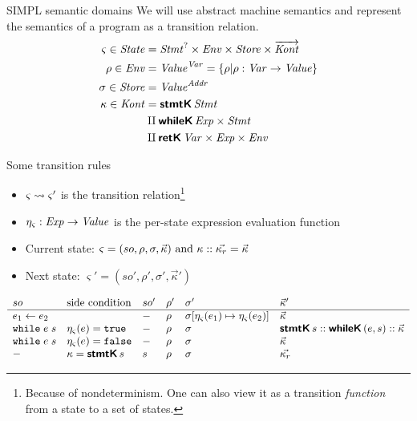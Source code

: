 \documentclass[aspectratio=169]{beamer}
\begin{document}
\begin{frame}{SIMPL semantic domains}
  \begingroup\footnotesize We will use abstract machine semantics and represent the semantics of a program as a transition relation.\endgroup
\begin{align*}
  \varsigma \in \mathit{State} & = \mathit{Stmt}^? \times \mathit{Env} \times \mathit{Store} \times \overrightarrow{\mathit{Kont}} \\
  \rho \in \mathit{Env} & = \mathit{Value}^{\mathit{Var}} = \left\{ \rho \vert \rho : \mathit{Var} \rightarrow \mathit{Value} \right\} \\
  \sigma \in \mathit{Store} & = \mathit{Value}^{\mathit{Addr}} \\
  \kappa \in \mathit{Kont} & = \textsf{\textbf{stmtK}}\,\mathit{Stmt} \\
                       & \amalg \textsf{\textbf{whileK}}\,\mathit{Exp} \times \mathit{Stmt} \\
                       & \amalg \textsf{\textbf{retK}}\,\mathit{Var} \times \mathit{Exp} \times \mathit{Env}
\end{align*}
\end{frame}
\begin{frame}{Some transition rules}
  \small
  \begin{itemize}
  \item $\varsigma \rightsquigarrow \varsigma'$ is the transition relation\footnote{Because of nondeterminism. One can also view it as a transition \emph{function} from a state to a set of states.}
  \item \(\eta_\varsigma : \mathit{Exp} \to \mathit{Value} \) is the per-state expression evaluation function
\item Current state: \(\varsigma = (so, \rho, \sigma, \vec{\kappa})$ and $\kappa :: \vec{\kappa_r} = \vec{\kappa} \)
\item Next state: \( \varsigma' = (so', \rho', \sigma', \vec{\kappa}') \) \pause
  \end{itemize}
  \footnotesize
  \[
  \begin{array}{llllll}
    so & \text{side condition} & so' & \rho' & \sigma' & \vec{\kappa}' \\ \hline
    e_1 \leftarrow e_2 & & - & \rho & \sigma[\eta_\varsigma(e_1) \mapsto \eta_\varsigma(e_2)] & \vec{\kappa} \\
    \texttt{while}\; e\; s & \eta_\varsigma(e) = \texttt{true} & - & \rho & \sigma & \textsf{\textbf{stmtK}}\,s :: \textsf{\textbf{whileK}}\,(e, s) :: \vec{\kappa} \\
    \texttt{while}\; e\; s & \eta_\varsigma(e) = \texttt{false} & - & \rho & \sigma & \vec{\kappa} \\
    - & \kappa = \textsf{\textbf{stmtK}}\,s & s & \rho & \sigma & \vec{\kappa_r}
  \end{array}
  \]
\end{frame}
\end{document}
